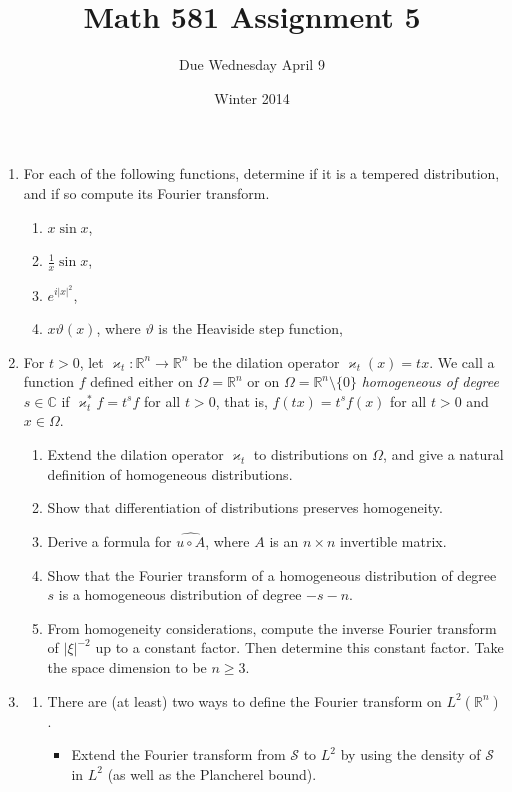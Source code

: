 \documentclass[11pt]{amsart}
\title{Math 581 Assignment 5}
\author{Due Wednesday April 9}
\date{Winter 2014}                                           %
\newcommand{\R}{\mathbb{R}}
\newcommand{\C}{\mathbb{C}}
\newcommand{\tstS}{\mathscr{S}}
\begin{document}
\maketitle

\begin{enumerate}[1.]
\item
For each of the following functions,
determine if it is a tempered distribution,
and if so compute its Fourier transform.
\begin{enumerate}[{\em a)}]
\item
$x\sin x$,
\item
$\frac1x\sin x$,
\item
$e^{i|x|^2}$, 
\item
$x\vartheta(x)$, where $\vartheta$ is the Heaviside step function,
\end{enumerate}
\item
For $t>0$, let $\varkappa_t:\R^n\to\R^n$ be the dilation operator $\varkappa_t(x)=tx$.
We call a function $f$ defined either on $\Omega=\R^n$ or on $\Omega=\R^n\setminus\{0\}$ {\em homogeneous of degree $s\in\C$} if 
$\varkappa_t^*f=t^sf$ for all $t>0$, that is, $f(tx)=t^sf(x)$ for all $t>0$ and $x\in\Omega$.
\begin{enumerate}[{\em a)}]
\item
Extend the dilation operator $\varkappa_t$ to distributions on $\Omega$, and give a natural definition of homogeneous distributions.
\item
Show that differentiation of distributions preserves homogeneity.
\item
Derive a formula for $\widehat{u\circ A}$, where $A$ is an $n\times n$ invertible matrix.
\item
Show that the Fourier transform of a homogeneous distribution of degree $s$ is
a homogeneous distribution of degree $-s-n$.
\item
From homogeneity considerations, compute the inverse Fourier transform of $|\xi|^{-2}$ up to a constant factor.
Then determine this constant factor.
Take the space dimension to be $n\geq3$.
\end{enumerate}
\item
\begin{enumerate}[{\em a)}]
\item
There are (at least) two ways to define the Fourier transform on $L^2(\R^n)$.
\begin{itemize}
\item
Extend the Fourier transform from $\tstS$ to $L^2$ by using the density of $\tstS$ in $L^2$ (as well as the Plancherel bound).

\end{itemize}
\end{enumerate}
\end{enumerate}
\end{document}
